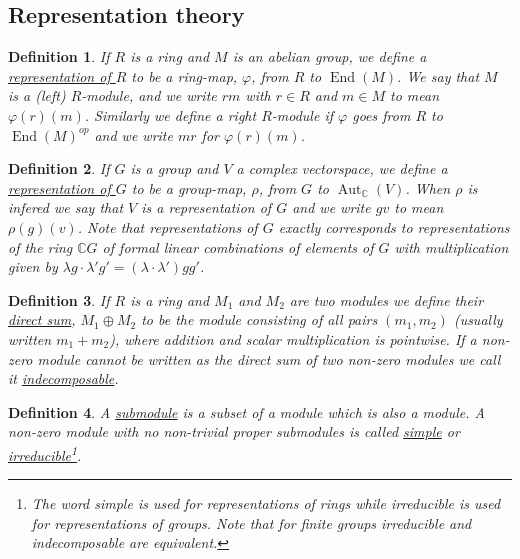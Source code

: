 \documentclass[11pt, a4paper, english]{article}
\numberwithin{prop}{section}
\numberwithin{lemma}{section}
\numberwithin{theorem}{section}
\newtheorem{defin}{Definition}
\numberwithin{defin}{section}
\numberwithin{example}{section}
\newcommand{\C}{\mathbb{C}}
\DeclareMathOperator{\End}{End}
\DeclareMathOperator{\Aut}{Aut}
\begin{document}
\begin{appendices}
\section{Representation theory}
\label{appendix}

\begin{defin}
If $R$ is a ring and $M$ is an abelian group, we define a \underline{representation of $R$} to be a ring-map, $\varphi$, from $R$ to $\End(M)$. We say that $M$ is a (left) $R$-module, and we write $rm$ with $r \in R$ and $m \in M$ to mean $\varphi(r)(m)$. Similarly we define a right $R$-module if $\varphi$ goes from $R$ to $\End(M)^{op}$ and we write $mr$ for $\varphi(r)(m)$.
\end{defin}

\begin{defin}
If $G$ is a group and $V$ a complex vectorspace, we define a \underline{representation of $G$} to be a group-map, $\rho$, from $G$ to $\Aut_\C(V)$. When $\rho$ is infered we say that $V$ is a representation of $G$ and we write $gv$ to mean $\rho(g)(v)$. Note that representations of $G$ exactly corresponds to representations of the ring $\C G$ of formal linear combinations of elements of $G$ with multiplication given by $\lambda g \cdot \lambda' g' = (\lambda \cdot \lambda')gg'$.
\end{defin}

\begin{defin}
If $R$ is a ring and $M_1$ and $M_2$ are two modules we define their \underline{direct sum}, $M_1 \oplus M_2$ to be the module consisting of all pairs $(m_1, m_2)$ (usually written $m_1 + m_2$), where addition and scalar multiplication is pointwise. If a non-zero module cannot be written as the direct sum of two non-zero modules we call it \underline{indecomposable}.
\end{defin}

\begin{defin}
A \underline{submodule} is a subset of a module which is also a module. A non-zero module with no non-trivial proper submodules is called \underline{simple} or \underline{irreducible}\footnote{The word simple is used for representations of rings while irreducible is used for representations of groups. Note that for finite groups irreducible and indecomposable are equivalent.}.
\end{defin}


\end{appendices}
\end{document}

